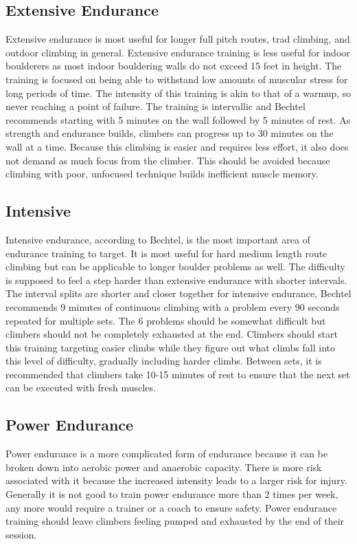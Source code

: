 \documentclass[10pt,twocolumn]{article}
\begin{document}
\subsection{Extensive Endurance}

	Extensive endurance is most useful for longer full pitch routes, trad climbing, and outdoor climbing in general. Extensive endurance training is less useful for indoor boulderers as most indoor bouldering walls do not exceed 15 feet in height. The training is focused on being able to withstand low amounts of muscular stress for long periods of time. The intensity of this training is akin to that of  a warmup, so never reaching a point of failure. The training is intervallic and Bechtel recommends starting with 5 minutes on the wall followed by 5 minutes of rest. As strength and endurance builds, climbers can progress up to 30 minutes on the wall at a time. Because this climbing is easier and requires less effort, it also does not demand as much focus from the climber. This should be avoided because climbing with poor, unfocused technique builds inefficient muscle memory. 

\subsection{Intensive}

	Intensive endurance, according to Bechtel, is the most important area of endurance training to target. It is most useful for hard medium length route climbing but can be applicable to longer boulder problems as well. The difficulty is supposed to feel a step harder than extensive endurance with shorter intervals. The interval splits are shorter and closer together for intensive endurance, Bechtel recommends 9 minutes of continuous climbing with a problem every 90 seconds repeated for multiple sets. The 6 problems should be somewhat difficult but climbers should not be completely exhausted at the end. Climbers should start this training targeting easier climbs while they figure out what climbs fall into this level of difficulty, gradually including harder climbs. Between sets, it is recommended that climbers take 10-15 minutes of rest to ensure that the next set can be executed with fresh muscles.

\subsection{Power Endurance}

	Power endurance is a more complicated form of endurance because it can be broken down into aerobic power and anaerobic capacity. There is more risk associated with it because the increased intensity leads to a larger risk for injury. Generally it is not good to train power endurance more than 2 times per week, any more would require a trainer or a coach to ensure safety. Power endurance training should leave climbers feeling pumped and exhausted by the end of their session.
\end{document}
